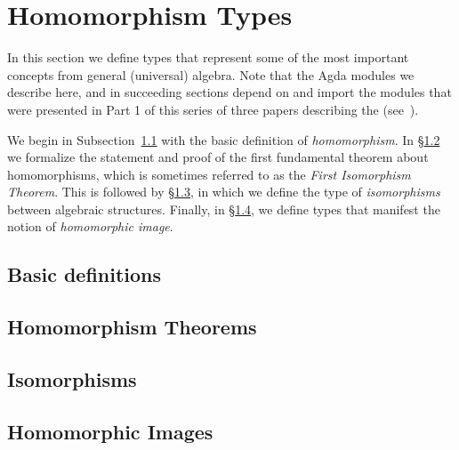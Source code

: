 \section{Homomorphism Types}\label{sec:homomorphism-types}
In this section we define types that represent some of the most important concepts from general (universal) algebra.  Note that the Agda modules we describe here, and in succeeding sections depend on and import the modules that were presented in Part 1 of this series of three papers describing the \agdaualib (see~\cite{DeMeo:2021-1}). 

We begin in Subsection~\ref{sec:basic-definitions} with the basic definition of \emph{homomorphism}. In \S\ref{sec:homom-theor} we formalize the statement and proof of the first fundamental theorem about homomorphisms, which is sometimes referred to as the \emph{First Isomorphism Theorem}. This is followed by \S\ref{sec:isomorphisms}, in which we define the type of \emph{isomorphisms} between algebraic structures.  Finally, in \S\ref{sec:hom-images}, we define types that manifest the notion of \emph{homomorphic image}.

\subsection{Basic definitions}\label{sec:basic-definitions}


\subsection{Homomorphism Theorems}\label{sec:homom-theor}


\subsection{Isomorphisms}\label{sec:isomorphisms}


\subsection{Homomorphic Images}\label{sec:hom-images}

